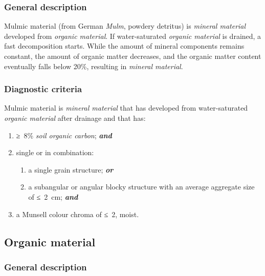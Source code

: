 \documentclass[
  letterpaper,
  DIV=11,
  numbers=noendperiod]{scrreprt}
\providecommand{\tightlist}{%
  \setlength{\itemsep}{0pt}\setlength{\parskip}{0pt}}\usepackage{longtable,booktabs,array}
\begin{document}
\hypertarget{general-description-63}{%
\subsubsection{General description}\label{general-description-63}}

Mulmic material (from German \emph{Mulm}, powdery detritus) is
\emph{mineral material} developed from \emph{organic material}. If
water-saturated \emph{organic material} is drained, a fast decomposition
starts. While the amount of mineral components remains constant, the
amount of organic matter decreases, and the organic matter content
eventually falls below 20\%, resulting in \emph{mineral material}.

\hypertarget{diagnostic-criteria-68}{%
\subsubsection{Diagnostic criteria}\label{diagnostic-criteria-68}}

Mulmic material is \emph{mineral material} that has developed from
water-saturated \emph{organic material} after drainage and that has:

\begin{enumerate}
\def\labelenumi{\arabic{enumi}.}
\tightlist
\item
  ≥~8\% \emph{soil organic carbon}; \textbf{\emph{and}}
\item
  single or in combination:

  \begin{enumerate}
  \def\labelenumii{\alph{enumii}.}
  \tightlist
  \item
    a single grain structure; \textbf{\emph{or}}
  \item
    a subangular or angular blocky structure with an average aggregate
    size of ≤~2~cm; \textbf{\emph{and}}
  \end{enumerate}
\item
  a Munsell colour chroma of ≤~2, moist.
\end{enumerate}

\hypertarget{organic-material}{%
\subsection{Organic material}\label{organic-material}}

\hypertarget{general-description-64}{%
\subsubsection{General description}\label{general-description-64}}
\end{document}
